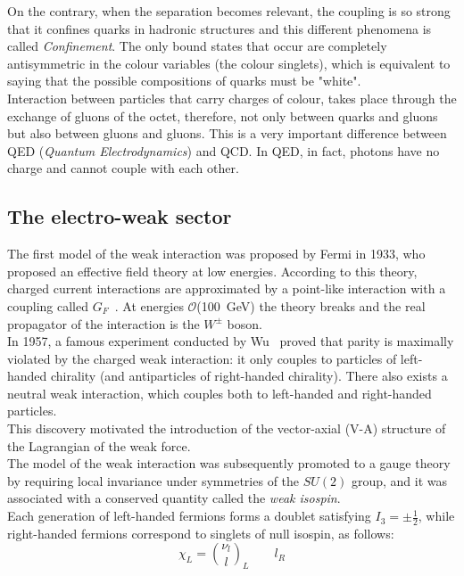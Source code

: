 On the contrary, when the separation becomes relevant, the coupling is so strong that it confines quarks in hadronic  structures and this different phenomena is called \textit{Confinement}.
The only bound states that occur are completely antisymmetric in the colour variables (the colour singlets), which is equivalent to saying that the possible compositions of quarks must be "white".\\
Interaction between particles that carry charges of colour, takes place through the exchange of gluons of the octet, therefore, not only between quarks and gluons but also between gluons and gluons. This is a very important difference between QED (\textit{Quantum Electrodynamics}) and QCD. In QED, in fact, photons have no charge and cannot couple with each other.

\subsection{The electro-weak sector}
\label{sec:ew}
The first model of the weak interaction was proposed by Fermi in 1933, who proposed an effective field theory at low energies. According to this theory, 
charged current interactions are approximated by a point-like interaction with a coupling called $G_F$~\cite{fermi,wilson}.
At energies $\mathcal{O}$(100~GeV) the theory breaks and the real propagator of the interaction is the $W^\pm$ boson.\\
In 1957, a famous experiment conducted by Wu~\cite{wu} proved that parity is maximally violated by the charged
weak interaction: it only couples to particles of left-handed chirality (and antiparticles of right-handed chirality). There also exists a neutral weak interaction, which couples both
to left-handed and right-handed particles. \\
This discovery motivated the introduction of the vector-axial (V-A) structure of the Lagrangian of the weak force. \\
The model of the weak interaction was subsequently promoted to a gauge theory by requiring local invariance under symmetries of the $SU(2)$ group, and it was associated
with a conserved quantity called the \textit{weak isospin}.
\vspace{\baselineskip}
\\Each generation of left-handed fermions forms a doublet satisfying $I_{3}= \pm\frac{1}{2}$, while right-handed fermions correspond to singlets of null isospin, as follows:
\begin{equation} 
\chi_{L}=\binom{\nu_l}{l}_L  \qquad l_R
\end{equation}

